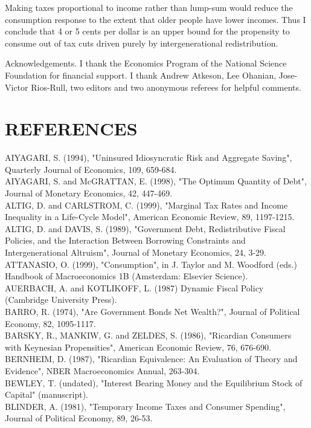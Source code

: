 \documentclass[11pt]{article}
\begin{document}
Making taxes proportional to income rather than lump-sum would reduce the consumption response to the extent that older people have lower incomes. Thus I conclude that 4 or 5 cents per dollar is an upper bound for the propensity to consume out of tax cuts driven purely by intergenerational redistribution.

Acknowledgements. I thank the Economics Program of the National Science Foundation for financial support. I thank Andrew Atkeson, Lee Ohanian, Jose-Victor Rios-Rull, two editors and two anonymous referees for helpful comments.

\section*{REFERENCES}
AIYAGARI, S. (1994), "Uninsured Idiosyncratic Risk and Aggregate Saving", Quarterly Journal of Economics, 109, 659-684.\\
AIYAGARI, S. and McGRATTAN, E. (1998), "The Optimum Quantity of Debt", Journal of Monetary Economics, 42, 447-469.\\
ALTIG, D. and CARLSTROM, C. (1999), "Marginal Tax Rates and Income Inequality in a Life-Cycle Model", American Economic Review, 89, 1197-1215.\\
ALTIG, D. and DAVIS, S. (1989), "Government Debt, Redistributive Fiscal Policies, and the Interaction Between Borrowing Constraints and Intergenerational Altruism", Journal of Monetary Economics, 24, 3-29.\\
ATTANASIO, O. (1999), "Consumption", in J. Taylor and M. Woodford (eds.) Handbook of Macroeconomics 1B (Amsterdam: Elsevier Science).\\
AUERBACH, A. and KOTLIKOFF, L. (1987) Dynamic Fiscal Policy (Cambridge University Press).\\
BARRO, R. (1974), "Are Government Bonds Net Wealth?", Journal of Political Economy, 82, 1095-1117.\\
BARSKY, R., MANKIW, G. and ZELDES, S. (1986), "Ricardian Consumers with Keynesian Propensities", American Economic Review, 76, 676-690.\\
BERNHEIM, D. (1987), "Ricardian Equivalence: An Evaluation of Theory and Evidence", NBER Macroeconomics Annual, 263-304.\\
BEWLEY, T. (undated), "Interest Bearing Money and the Equilibrium Stock of Capital" (manuscript).\\
BLINDER, A. (1981), "Temporary Income Taxes and Consumer Spending", Journal of Political Economy, 89, 26-53.\\
\end{document}
